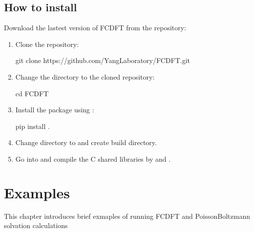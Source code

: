 \documentclass[letterpaper,10pt,english]{sphinxmanual}
\begin{document}
\section{How to install}
\label{\detokenize{install:how-to-install}}
\sphinxAtStartPar
Download the lastest version of FC\sphinxhyphen{}DFT from the repository:
\begin{enumerate}
%
\item {} 
\sphinxAtStartPar
Clone the repository:

\begin{sphinxVerbatim}[commandchars=\\\{\}]
\PYGZdl{} git clone https://github.com/Yang\PYGZhy{}Laboratory/FC\PYGZhy{}DFT.git
\end{sphinxVerbatim}

\item {} 
\sphinxAtStartPar
Change the directory to the cloned repository:

\begin{sphinxVerbatim}[commandchars=\\\{\}]
\PYGZdl{} cd FC\PYGZhy{}DFT
\end{sphinxVerbatim}

\item {} 
\sphinxAtStartPar
Install the package using :

\begin{sphinxVerbatim}[commandchars=\\\{\}]
\PYGZdl{} pip install .
\end{sphinxVerbatim}

\item {} 
\sphinxAtStartPar
Change directory to  and create build directory.

\item {} 
\sphinxAtStartPar
Go into  and compile the C shared libraries by  and .

\end{enumerate}

\sphinxstepscope


\chapter{Examples}
\label{\detokenize{examples:examples}}\label{\detokenize{examples::doc}}
\sphinxAtStartPar
This chapter introduces brief exmaples of running FC\sphinxhyphen{}DFT and Poisson\sphinxhyphen{}Boltzmann solvation calculations
\end{document}
